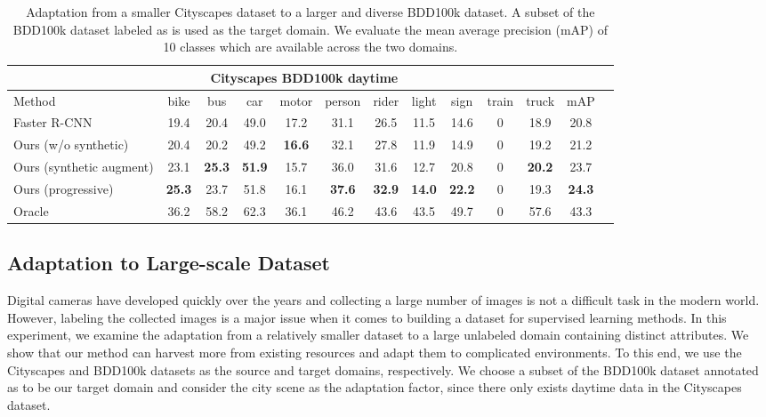 \documentclass[10pt,twocolumn,letterpaper]{article}
\begin{document}
\begin{table*}[t]
\begin{center}
\caption{
Adaptation from a smaller Cityscapes dataset to a larger and diverse BDD100k dataset.
A subset of the BDD100k dataset labeled as  is used as the target domain. 
We evaluate the mean average precision (mAP) of 10 classes which are available across the two domains.
}
\vspace{1mm}
\label{tab:C_B}
\begin{tabular}{lcccccccccccc}
                \toprule
                \multicolumn{12}{c}{Cityscapes  BDD100k daytime} \\
                \midrule
                Method & bike & bus & car & motor & person & rider & light & sign & train & truck & mAP \\
                \midrule
                Faster R-CNN & 19.4& 20.4& 49.0& 17.2& 31.1& 26.5& 11.5& 14.6& 0& 18.9& 20.8\\
                \midrule
                Ours (w/o synthetic) & 20.4& 20.2& 49.2& \textbf{16.6}& 32.1& 27.8& 11.9& 14.9& 0& 19.2& 21.2\\
                Ours (synthetic augment) & 23.1& \textbf{25.3}& \textbf{51.9}& 15.7& 36.0& 31.6& 12.7& 20.8& 0& \textbf{20.2}& 23.7 \\
                Ours (progressive) & \textbf{25.3}& 23.7& 51.8& 16.1& \textbf{37.6}& \textbf{32.9}& \textbf{14.0}& \textbf{22.2}& 0& 19.3& \textbf{24.3}\\        
			   \midrule
			   Oracle & 36.2& 58.2& 62.3& 36.1& 46.2& 43.6& 43.5& 49.7& 0& 57.6& 43.3\\
			  \bottomrule
			   
\end{tabular}
\end{center}
\vspace{-1mm}
\end{table*}





\subsection{Adaptation to Large-scale Dataset} \label{largescale}
Digital cameras have developed quickly over the years and collecting a large number of images is not a difficult task in the modern world.
However, labeling the collected images is a major issue when it comes to building a dataset for supervised learning methods.
In this experiment, we examine the adaptation from a relatively smaller dataset to a large unlabeled domain containing distinct attributes.
We show that our method can harvest more from existing resources and adapt them to complicated environments.
To this end, we use the Cityscapes \cite{Cordts2016Cityscapes} and BDD100k \cite{Yu2018BDD100KAD} datasets as the source and target domains, respectively.
We choose a subset of the BDD100k dataset annotated as  to be our target domain and consider the city scene as the adaptation factor, since there only exists daytime data in the Cityscapes dataset.
\end{document}
